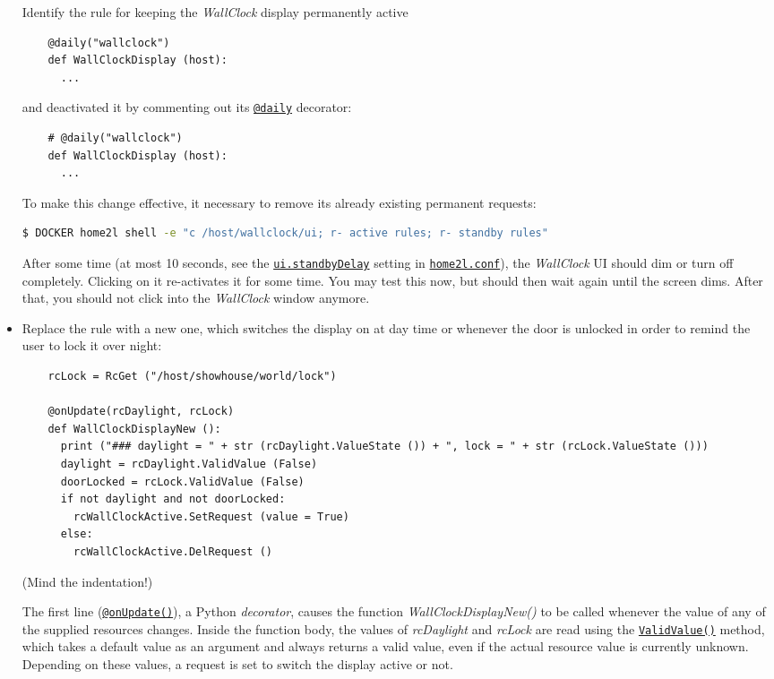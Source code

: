 \documentclass[12pt,english,parskip=half,headheight=19pt]{scrreprt}
\newcommand{\lst}[1]{\colorbox{lstbackground}{\footnotesize\code{#1}}}
\newcommand{\idx}[1]{#1\index{#1}}
\newcommand{\refenv}[1]{\hyperref[env:#1]{\texttt{#1}}}        %
\newcommand{\reftool}[1]{\hyperref[tool:#1]{\texttt{\idx{#1}}}}
\newcommand{\refapipython}[1]{\href{home2l-api_python/index.html}{\mbox{\texttt{#1}}}}  %
\begin{document}
\begin{itemize}[$\blacktriangleright$]
  Identify the rule for keeping the \textit{WallClock} display permanently active
  \begin{lstlisting}
    @daily("wallclock")
    def WallClockDisplay (host):
      ...
  \end{lstlisting}
  and deactivated it by commenting out its \refapipython{@daily} decorator:
  \begin{lstlisting}
    # @daily("wallclock")
    def WallClockDisplay (host):
      ...
  \end{lstlisting}

  To make this change effective, it necessary to remove its already existing permanent requests:
  \begin{lstlisting}[language=bash]
    $ DOCKER home2l shell -e "c /host/wallclock/ui; r- active rules; r- standby rules"
  \end{lstlisting}

  After some time (at most 10 seconds, see the \refenv{ui.standbyDelay} setting in
  \reftool{home2l.conf}), the \textit{WallClock} UI should dim or turn off
  completely. Clicking on it re-activates it for some time. You may test
  this now, but should then wait again until the screen dims. After that,
  you should not click into the \textit{WallClock} window anymore.

\item
  Replace the \lst{WallClockDisplay} rule with a new one, which switches the display on
  at day time or whenever the door is unlocked in order to remind the user to
  lock it over night:
  \begin{lstlisting}
    rcLock = RcGet ("/host/showhouse/world/lock")

    @onUpdate(rcDaylight, rcLock)
    def WallClockDisplayNew ():
      print ("### daylight = " + str (rcDaylight.ValueState ()) + ", lock = " + str (rcLock.ValueState ()))
      daylight = rcDaylight.ValidValue (False)
      doorLocked = rcLock.ValidValue (False)
      if not daylight and not doorLocked:
        rcWallClockActive.SetRequest (value = True)
      else:
        rcWallClockActive.DelRequest ()
  \end{lstlisting}

  (Mind the indentation!)

  The first line (\refapipython{@onUpdate()}), a Python \textit{decorator},
  causes the function \textit{WallClockDisplayNew()} to be called whenever
  the value of any of the supplied resources changes. Inside the function
  body, the values of \textit{rcDaylight} and \textit{rcLock} are
  read using the \refapipython{ValidValue()} method, which takes a default
  value as an argument and always returns a valid value, even if the
  actual resource value is currently unknown. Depending on these values, a
  request is set to switch the display active or not.


\end{itemize}
\end{document}
